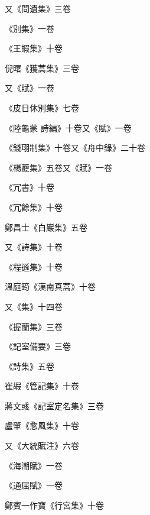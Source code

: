 \begin{pinyinscope}
 又《問遺集》三卷



 《別集》一卷



 《王嘏集》十卷



 倪曙《獲蒿集》三卷



 又《賦》一卷



 《皮日休別集》七卷



 《陸龜蒙
 詩編》十卷又《賦》一卷



 《錢珝制集》十卷又《舟中錄》二十卷



 《楊夔集》五卷又《賦》一卷



 《冗書》十卷



 《冗餘集》十卷



 鄭昌士《白巖集》五卷



 又《詩集》十卷



 《程遜集》十卷



 溫庭筠《漢南真蒿》十卷



 又《集》十四卷



 《握蘭集》三卷



 《記室備要》三卷



 《詩集》五卷



 崔嘏《管記集》十卷



 蔣文彧《記室定名集》三卷



 盧肇《愈風集》十卷



 又《大統賦注》六卷



 《海潮賦》一卷



 《通屈賦》一卷



 鄭賓一作寶《行宮集》十卷




\end{pinyinscope}
